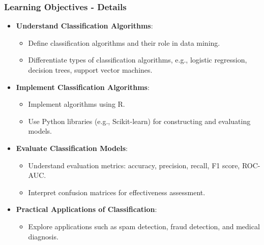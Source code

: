 \documentclass{beamer}
\begin{document}
\begin{frame}
    \frametitle{Learning Objectives - Details}
    \begin{itemize}
        \item \textbf{Understand Classification Algorithms}:
            \begin{itemize}
                \item Define classification algorithms and their role in data mining.
                \item Differentiate types of classification algorithms, e.g., logistic regression, decision trees, support vector machines.
            \end{itemize}
        
        \item \textbf{Implement Classification Algorithms}:
            \begin{itemize}
                \item Implement algorithms using R.
                \item Use Python libraries (e.g., Scikit-learn) for constructing and evaluating models.
            \end{itemize}
        
        \item \textbf{Evaluate Classification Models}:
            \begin{itemize}
                \item Understand evaluation metrics: accuracy, precision, recall, F1 score, ROC-AUC.
                \item Interpret confusion matrices for effectiveness assessment.
            \end{itemize}
        
        \item \textbf{Practical Applications of Classification}:
            \begin{itemize}
                \item Explore applications such as spam detection, fraud detection, and medical diagnosis.
            \end{itemize}
    \end{itemize}
\end{frame}
\end{document}
